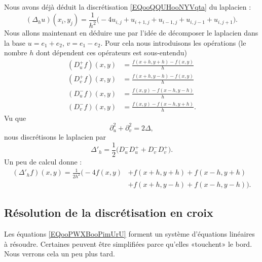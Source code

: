 Nous avons déjà déduit la discrétisation \eqref{EQooQQUHooNYVqta} du laplacien :
\begin{equation}
	(\Delta_hu)(x_i,y_j)=\frac{1}{ h^2 }\big( -4u_{i,j}+u_{i+1,j}+u_{i-1,j}+u_{i,j-1}+u_{i,j+1} \big).
\end{equation}
Nous allons maintenant en déduire une par l'idée de décomposer le laplacien dans la base \( u=e_1+e_2\), \( v=e_1-e_2\). Pour cela nous introduisons les opérations (le nombre \( h\) dont dépendent ces opérateurs est sous-entendu)
\begin{subequations}
	\begin{align}
		(D^+_uf)(x,y) & =\frac{ f(x+h,y+h)-f(x,y) }{ h }  \\
		(D^+_vf)(x,y) & =\frac{ f(x+h,y-h)-f(x,y) }{ h }  \\
		(D^-_uf)(x,y) & =\frac{ f(x,y)-f(x-h,y-h) }{ h }  \\
		(D^-_vf)(x,y) & =\frac{ f(x,y)-f(x-h,y+h) }{ h }.
	\end{align}
\end{subequations}
Vu que
\begin{equation}
	\partial_u^2+\partial_v^2=2\Delta,
\end{equation}
nous discrétisons le laplacien par
\begin{equation}
	\Delta'_h=\frac{ 1 }{2}\big( D_u^-D_u^++D_v^-D_v^+ \big).
\end{equation}
Un peu de calcul donne :
\begin{subequations}   \label{EQooLHBDooSBFkho}
	\begin{align}
		(\Delta'_hf)(x,y)=\frac{1}{ 2h^2 }\Big( -4f(x,y) & +f(x+h,y+h)+f(x-h,y+h)        \\
		                                                 & +f(x+h,y-h)+f(x-h,y-h) \Big).
	\end{align}
\end{subequations}

\subsection{Résolution de la discrétisation en croix}

Les équations \eqref{EQooPWXBooPimUrU} forment un système d'équations linéaires à résoudre. Certaines peuvent être simplifiées parce qu'elles «touchent» le bord. Nous verrons cela un peu plus tard.

